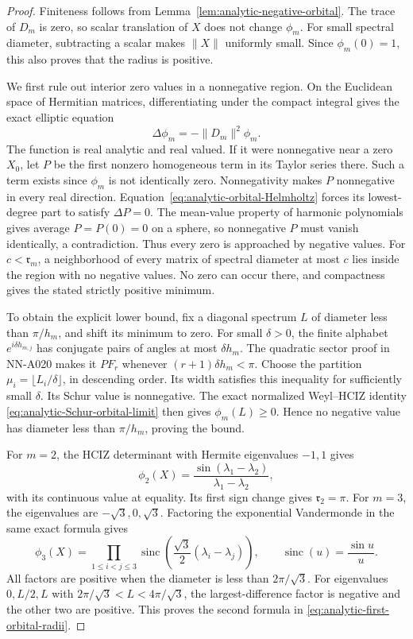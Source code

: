 \begin{proof}
Finiteness follows from Lemma~\ref{lem:analytic-negative-orbital}.
The trace of $D_m$ is zero, so scalar translation of $X$ does not
change $\phi_m$. For small spectral diameter, subtracting a scalar
makes $\|X\|$ uniformly small. Since $\phi_m(0)=1$, this also proves
that the radius is positive.

We first rule out interior zero values in a nonnegative region.
On the Euclidean space of Hermitian matrices, differentiating under
the compact integral gives the exact elliptic equation
\begin{equation}\label{eq:analytic-orbital-Helmholtz}
                         \Delta\phi_m=-\|D_m\|^2\phi_m.
\end{equation}
The function is real analytic and real valued. If it were nonnegative
near a zero $X_0$, let $P$ be the first nonzero homogeneous term in
its Taylor series there. Such a term exists since $\phi_m$ is not
identically zero. Nonnegativity makes $P$ nonnegative in every real
direction. Equation~\eqref{eq:analytic-orbital-Helmholtz} forces its
lowest-degree part to satisfy $\Delta P=0$. The mean-value property
of harmonic polynomials gives average $P= P(0)=0$ on a sphere, so
nonnegative $P$ must vanish identically, a contradiction. Thus every
zero is approached by negative values. For $c<\mathfrak r_m$, a
neighborhood of every matrix of spectral diameter at most $c$ lies
inside the region with no negative values. No zero can occur there,
and compactness gives the stated strictly positive minimum.

To obtain the explicit lower bound, fix a diagonal spectrum $L$ of
diameter less than $\pi/h_m$, and shift its minimum to zero.
For small $\delta>0$, the finite alphabet
$e^{i\delta h_{m,j}}$ has conjugate pairs of angles at most
$\delta h_m$. The quadratic sector proof in NN-A020 makes it
$PF_r$ whenever $(r+1)\delta h_m<\pi$. Choose the partition
$\mu_i=\lfloor L_i/\delta\rfloor$, in descending order.
Its width satisfies this inequality for sufficiently small $\delta$.
Its Schur value is nonnegative. The exact normalized Weyl--HCIZ
identity \eqref{eq:analytic-Schur-orbital-limit} then gives
$\phi_m(L)\ge0$. Hence no negative value has diameter less than
$\pi/h_m$, proving the bound.

For $m=2$, the HCIZ determinant with Hermite eigenvalues $-1,1$
gives
\[
                \phi_2(X)=\frac{\sin(\lambda_1-\lambda_2)}
                                      {\lambda_1-\lambda_2},
\]
with its continuous value at equality. Its first sign change gives
$\mathfrak r_2=\pi$. For $m=3$, the eigenvalues are
$-\sqrt3,0,\sqrt3$. Factoring the exponential Vandermonde in the
same exact formula gives
\[
 \phi_3(X)=\prod_{1\le i<j\le3}
            \operatorname{sinc}\left(
                          \frac{\sqrt3}{2}(\lambda_i-\lambda_j)\right),
                    \qquad\operatorname{sinc}(u)=\frac{\sin u}{u}.
\]
All factors are positive when the diameter is less than
$2\pi/\sqrt3$. For eigenvalues $0,L/2,L$ with
$2\pi/\sqrt3<L<4\pi/\sqrt3$, the largest-difference factor is
negative and the other two are positive. This proves the second
formula in \eqref{eq:analytic-first-orbital-radii}.
\end{proof}

